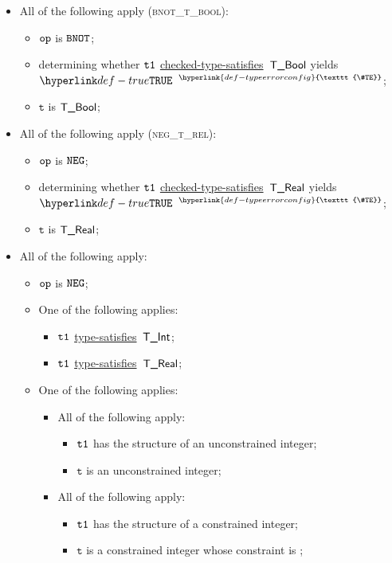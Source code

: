\documentclass{book}
\newcommand\TypeErrorConfig[0]{\hyperlink{def-typeerrorconfig}{\texttt{\#TE}}}
\newcommand\ProseOrTypeError[0]{\hyperlink{def-proseortypeerror}{$^{\TypeErrorConfig}$}}
\newcommand\typesatisfies[0]{\hyperlink{def-typesatisfies}{type-satisfies}}
\newcommand\checkedtypesatisfies[0]{\hyperlink{def-checktypesat}{checked-type-satisfies}}
\newcommand\vt[0]{\texttt{t}}
\begin{document}
  \begin{itemize}
  \item All of the following apply (\textsc{bnot\_t\_bool}):
    \begin{itemize}
      \item $\texttt{op}$ is $\texttt{BNOT}$;
      \item determining whether $\texttt{t1}$ \checkedtypesatisfies\ $\textsf{T\_Bool}$ yields $\True$ \ProseOrTypeError;
      \item $\vt$ is $\textsf{T\_Bool}$;
    \end{itemize}

  \item All of the following apply (\textsc{neg\_t\_rel}):
  \begin{itemize}
    \item $\texttt{op}$ is $\texttt{NEG}$;
    \item determining whether $\texttt{t1}$ \checkedtypesatisfies\ $\textsf{T\_Real}$ yields $\True$ \ProseOrTypeError;
    \item $\vt$ is $\textsf{T\_Real}$;
  \end{itemize}

  \item All of the following apply:
    \begin{itemize}
    \item $\texttt{op}$ is $\texttt{NEG}$;
    \item One of the following applies:
      \begin{itemize}
      \item $\texttt{t1}$ \typesatisfies\  $\textsf{T\_Int}$;
      \item $\texttt{t1}$ \typesatisfies\  $\textsf{T\_Real}$;
      \end{itemize}
     \item One of the following applies:
       \begin{itemize}
       \item All of the following apply:
         \begin{itemize}
         \item $\texttt{t1}$ has the structure of an unconstrained integer;
         \item $\vt$ is an unconstrained integer;
         \end{itemize}
       \item All of the following apply:
         \begin{itemize}
         \item $\texttt{t1}$ has the structure of a constrained integer;
         \item $\vt$ is a constrained integer whose constraint is ;
         \end{itemize}
       \end{itemize}
    \end{itemize}


\end{itemize}
\end{document}
